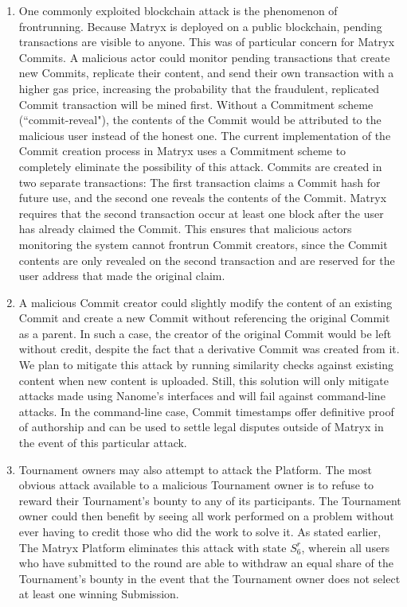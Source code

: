 \documentclass[a4paper, 10pt, conference]{ieeeconf}      %
\begin{document}
\begin{enumerate}
\item One commonly exploited blockchain attack is the phenomenon of frontrunning. Because Matryx is deployed on a public blockchain, pending transactions are visible to anyone. This was of particular concern for Matryx Commits. A malicious actor could monitor pending transactions that create new Commits, replicate their content, and send their own transaction with a higher gas price, increasing the probability that the fraudulent, replicated Commit transaction will be mined first. Without a Commitment scheme (``commit-reveal"), the contents of the Commit would be attributed to the malicious user instead of the honest one. The current implementation of the Commit creation process in Matryx uses a Commitment scheme to completely eliminate the possibility of this attack. Commits are created in two separate transactions: The first transaction claims a Commit hash for future use, and the second one reveals the contents of the Commit. Matryx requires that the second transaction occur at least one block after the user has already claimed the Commit. This ensures that malicious actors monitoring the system cannot frontrun Commit creators, since the Commit contents are only revealed on the second transaction and are reserved for the user address that made the original claim.
\item A malicious Commit creator could slightly modify the content of an existing Commit and create a new Commit without referencing the original Commit as a parent. In such a case, the creator of the original Commit would be left without credit, despite the fact that a derivative Commit was created from it. We plan to mitigate this attack by running similarity checks against existing content when new content is uploaded. Still, this solution will only mitigate attacks made using Nanome's interfaces and will fail against command-line attacks. In the command-line case, Commit timestamps offer definitive proof of authorship and can be used to settle legal disputes outside of Matryx in the event of this particular attack.
\item Tournament owners may also attempt to attack the Platform. The most obvious attack available to a malicious Tournament owner is to refuse to reward their Tournament's bounty to any of its participants. The Tournament owner could then benefit by seeing all work performed on a problem without ever having to credit those who did the work to solve it. As stated earlier, The Matryx Platform eliminates this attack with state $S_{6}^r$, wherein all users who have submitted to the round are able to withdraw an equal share of the Tournament's bounty in the event that the Tournament owner does not select at least one winning Submission.
\end{enumerate}
\end{document}
